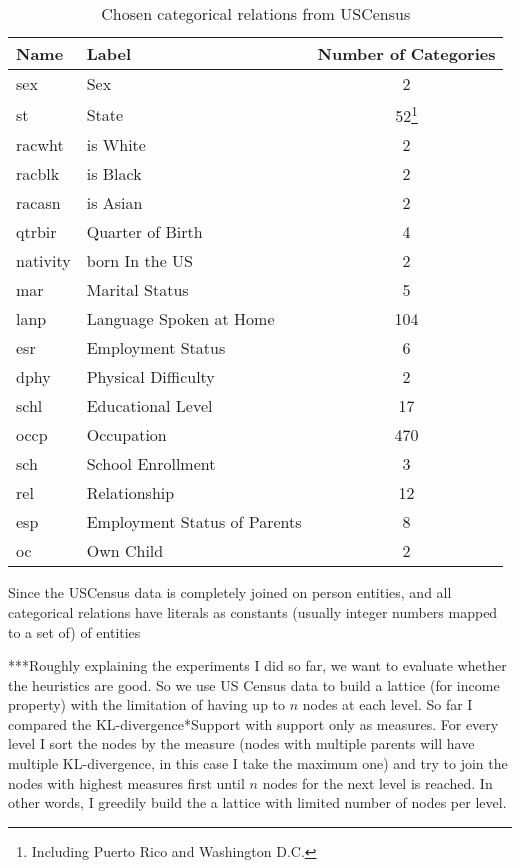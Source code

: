 \begin{table}[h!]
\begin{minipage}{\textwidth}
 \begin{center}
 \caption{Chosen categorical relations from USCensus}
  \begin{tabular}{l l c}
    \toprule
      Name	& Label				& Number of Categories \\
    \midrule
      sex	& Sex				&	2	\\
      st	& State				&	52\footnote{Including Puerto Rico and Washington D.C.}	\\
      racwht	& is White			&	2	\\
      racblk	& is Black			&	2	\\
      racasn	& is Asian			&	2	\\
      qtrbir	& Quarter of Birth		&	4	\\	
      nativity	& born In the US		&	2	\\
      mar	& Marital Status		&	5	\\
      lanp	& Language Spoken at Home	&	104	\\
      esr	& Employment Status		&	6	\\
      dphy	& Physical Difficulty		&	2	\\
      schl	& Educational Level		&	17	\\	
      occp	& Occupation			&	470	\\
      sch	& School Enrollment		&	3	\\
      rel	& Relationship			&	12	\\
      esp	& Employment Status of Parents	&	8	\\
      oc	& Own Child			&	2	\\
    \bottomrule
  \end{tabular}
 \label{tab:uscensusRelations}
 \end{center}
\end{minipage}
\end{table}




Since the USCensus data is completely joined on person entities, and all categorical relations have literals as
constants (usually integer numbers mapped to a set of) of entities 

***Roughly explaining the experiments I did so far, we want to evaluate whether the heuristics are good.
So we use US Census data to build a lattice (for income property) with the limitation of having up to $n$ nodes at each
level. So far I compared the KL-divergence*Support with support only as measures. For every level I sort the nodes by
the measure (nodes with multiple parents will have multiple KL-divergence, in this case I take the maximum one) and try
to join the nodes with highest measures first until $n$ nodes for the next level is reached. In other words, I greedily
build the a lattice with limited number of nodes per level.

